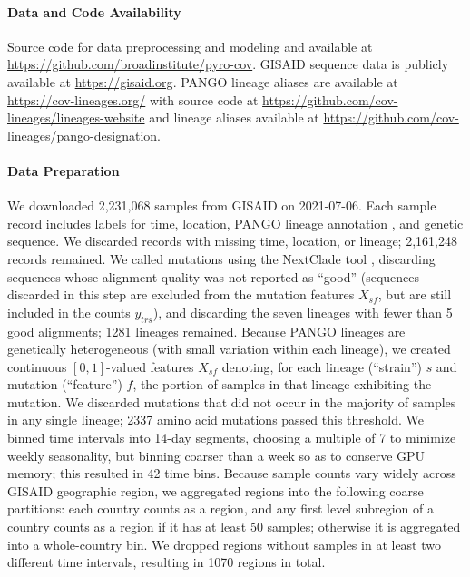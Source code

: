 \documentclass[12pt]{article}
\begin{document}
\paragraph*{Data and Code Availability}

Source code for data preprocessing and modeling and available at
\url{https://github.com/broadinstitute/pyro-cov}.
GISAID sequence data is publicly available at
\url{https://gisaid.org}.
PANGO lineage aliases are available at \url{https://cov-lineages.org/} with source code at \url{https://github.com/cov-lineages/lineages-website} and lineage aliases available at \url{https://github.com/cov-lineages/pango-designation}.

\paragraph*{Data Preparation}

We downloaded 2,231,068 samples from GISAID 
\cite{elbe2017gisaid} on 2021-07-06.
Each sample record includes labels for time, location, PANGO lineage annotation \cite{rambaut2020dynamic}, and genetic sequence.
We discarded records with missing time, location, or lineage; 2,161,248 records remained.
We called mutations using the NextClade tool \cite{aksamentov2020nextclade}, discarding sequences whose alignment quality was not reported as ``good'' (sequences discarded in this step are excluded from the mutation features $X_{sf}$, but are still included in the counts $y_{trs}$), and discarding the seven lineages with fewer than 5 good alignments; 1281 lineages remained.
Because PANGO lineages are genetically heterogeneous (with small variation within each lineage), we created continuous $[0, 1]$-valued features $X_{sf}$ denoting, for each lineage (``strain'') $s$ and mutation (``feature'') $f$, the portion of samples in that lineage exhibiting the mutation.
We discarded mutations that did not occur in the majority of samples in any single lineage; 2337 amino acid mutations passed this threshold.
We binned time intervals into 14-day segments, choosing a multiple of 7 to minimize weekly seasonality, but binning coarser than a week so as to conserve GPU memory; this resulted in 42 time bins.
Because sample counts vary widely across GISAID geographic region, we aggregated regions into the following coarse partitions: each country counts as a region, and any first level subregion of a country counts as a region if it has at least 50 samples; otherwise it is aggregated into a whole-country bin.
We dropped regions without samples in at least two different time intervals, resulting in 1070 regions in total.
\end{document}
